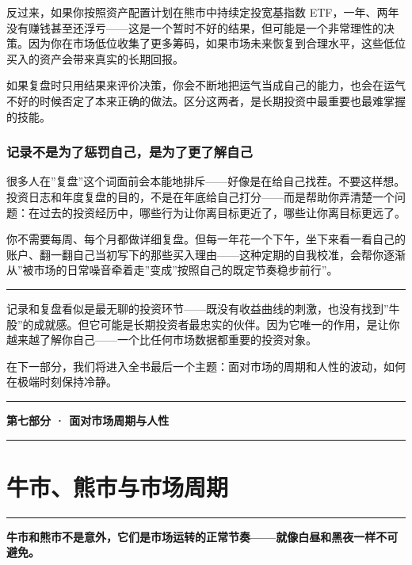 \documentclass[a4paper,11pt,oneside,fontset=none,UTF8,zihao=-4]{ctexbook}
\newcommand{\partdivider}[1]{%
  \clearpage
  \thispagestyle{empty}%
  \vspace*{5.0cm}%
  \begin{center}%
    {\color{dh-blossom}\rule{0.35\textwidth}{1.5pt}\par}%
    \vspace{1.2cm}%
    {\Huge\bfseries\sffamily\color{dh-navy} #1\par}%
    \vspace{1.2cm}%
    {\color{dh-blossom}\rule{0.35\textwidth}{1.5pt}\par}%
  \end{center}%
  \vfill
  \clearpage
}
\begin{document}
反过来，如果你按照资产配置计划在熊市中持续定投宽基指数
ETF，一年、两年没有赚钱甚至还浮亏------这是一个暂时不好的结果，但可能是一个非常理性的决策。因为你在市场低位收集了更多筹码，如果市场未来恢复到合理水平，这些低位买入的资产会带来真实的长期回报。

如果复盘时只用结果来评价决策，你会不断地把运气当成自己的能力，也会在运气不好的时候否定了本来正确的做法。区分这两者，是长期投资中最重要也最难掌握的技能。

\subsection{记录不是为了惩罚自己，是为了更了解自己}\label{ux8bb0ux5f55ux4e0dux662fux4e3aux4e86ux60e9ux7f5aux81eaux5df1ux662fux4e3aux4e86ux66f4ux4e86ux89e3ux81eaux5df1}

很多人在''复盘''这个词面前会本能地排斥------好像是在给自己找茬。不要这样想。投资日志和年度复盘的目的，不是在年底给自己打分------而是帮助你弄清楚一个问题：在过去的投资经历中，哪些行为让你离目标更近了，哪些让你离目标更远了。

你不需要每周、每个月都做详细复盘。但每一年花一个下午，坐下来看一看自己的账户、翻一翻自己当初写下的那些买入理由------这种定期的自我校准，会帮你逐渐从''被市场的日常噪音牵着走''变成''按照自己的既定节奏稳步前行''。

\begin{center}{\color{dh-bronze}\rule{0.2\textwidth}{0.5pt}}\end{center}

记录和复盘看似是最无聊的投资环节------既没有收益曲线的刺激，也没有找到''牛股''的成就感。但它可能是长期投资者最忠实的伙伴。因为它唯一的作用，是让你越来越了解你自己------一个比任何市场数据都重要的投资对象。

在下一部分，我们将进入全书最后一个主题：面对市场的周期和人性的波动，如何在极端时刻保持冷静。

\partdivider{第七部分 · 面对市场周期与人性}

\newpage

\chapter{牛市、熊市与市场周期}\label{ux725bux5e02ux718aux5e02ux4e0eux5e02ux573aux5468ux671f}

\begin{center}{\color{dh-bronze}\rule{0.2\textwidth}{0.5pt}}\end{center}

\begin{dhquote}
\textbf{牛市和熊市不是意外，它们是市场运转的正常节奏------就像白昼和黑夜一样不可避免。}
\end{dhquote}
\end{document}
